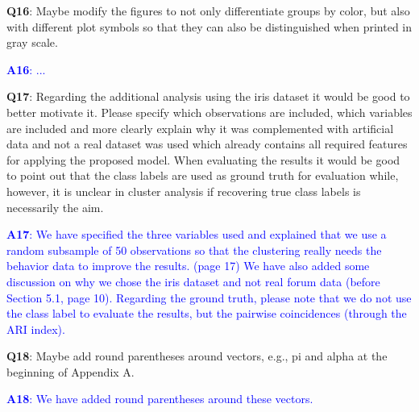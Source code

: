 \documentclass[]{article}
\begin{document}
	
	\vspace{3mm}
	\textbf{Q16}:  Maybe modify the figures to not only differentiate groups by color, but also with different plot symbols so that they can also be distinguished when printed in gray scale.

	\textcolor{blue}{  
	\textbf{A16}: ...
	} 

	
	\vspace{3mm}
	\textbf{Q17}: Regarding the additional analysis using the iris dataset it would be good to better motivate it. Please specify which observations are included, which variables are included and more clearly explain why it was complemented with artificial data and not a real dataset was used which already contains all required features for applying the proposed model. When evaluating the results it would be good to point out that the class labels are used as ground truth for evaluation while, however, it is unclear in cluster analysis if recovering true class labels is necessarily the aim.

	\textcolor{blue}{  
	\textbf{A17}:  We have specified the three variables used and explained that we use a random subsample of 50 observations so that the clustering really needs the behavior data to improve the results.  (page 17) We have also added some discussion on why we chose the iris dataset and not real forum data (before Section 5.1, page 10). Regarding the ground truth, please note that we do not use the class label to evaluate the results, but the pairwise coincidences (through the ARI index).
	} 
	
	\vspace{3mm}
	\textbf{Q18}: Maybe add round parentheses around vectors, e.g., pi and alpha at the beginning of Appendix A.
	
	\textcolor{blue}{  
	\textbf{A18}: We have added round parentheses around these vectors.
	} 
	
\end{document}
